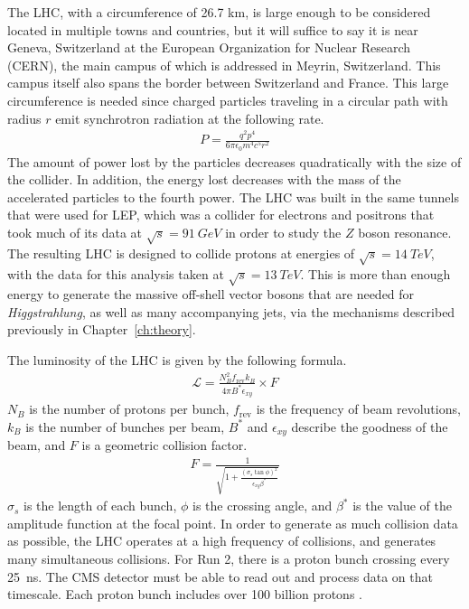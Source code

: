 The LHC, with a circumference of 26.7 km,
is large enough to be considered located in multiple towns and countries,
but it will suffice to say it is near Geneva, Switzerland
at the European Organization for Nuclear Research (CERN),
the main campus of which is addressed in Meyrin, Switzerland.
This campus itself also spans the border between Switzerland and France.
This large circumference is needed since charged particles traveling
in a circular path with radius $r$ emit synchrotron radiation at the following rate.
\begin{gather}
  P = \frac{q^2 p^4}{6\pi \epsilon_0 m^4 c^5 r^2}
\end{gather}
The amount of power lost by the particles decreases quadratically
with the size of the collider.
In addition, the energy lost decreases with the mass of the accelerated particles
to the fourth power.
The LHC was built in the same tunnels that were used for LEP,
which was a collider for electrons and positrons that took much of its data at
$\sqrt{s} = \SI{91}{GeV}$ in order to study the $Z$ boson resonance.
The resulting LHC is designed to collide protons at energies of $\sqrt{s} = \SI{14}{TeV}$,
with the data for this analysis taken at $\sqrt{s} = \SI{13}{TeV}$.
This is more than enough energy to generate the massive off-shell
vector bosons that are needed for \emph{Higgstrahlung},
as well as many accompanying jets,
via the mechanisms described previously in Chapter~\ref{ch:theory}.

The luminosity of the LHC is given by the following formula.
\begin{gather}
  \mathcal{L} = \frac{N^2_B f_{\text{rev}} k_B}{4\pi B^* \epsilon_{xy}} \times F
\end{gather}
$N_B$ is the number of protons per bunch,
$f_{\text{rev}}$ is the frequency of beam revolutions,
$k_B$ is the number of bunches per beam,
$B^*$ and $\epsilon_{xy}$ describe the goodness of the beam,
and $F$ is a geometric collision factor.
\begin{gather}
  F = \frac{1}{\sqrt{1 + \frac{(\sigma_s \tan \phi)^2}{\epsilon_{xy} \beta^*}}}
\end{gather}
$\sigma_s$ is the length of each bunch,
$\phi$ is the crossing angle,
and $\beta^*$ is the value of the amplitude function at the focal point.
In order to generate as much collision data as possible,
the LHC operates at a high frequency of collisions,
and generates many simultaneous collisions.
For Run 2, there is a proton bunch crossing every \SI{25}{ns}.
The CMS detector must be able to read out and process data on that timescale.
Each proton bunch includes over 100 billion protons \cite{Bruce:2201447}.

